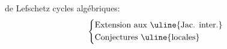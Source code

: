  de Lefschetz  cycles algébriques:
\[
\left\{\begin{aligned}
&\text{Extension aux \uline{Jac. inter.}}\\
&\text{Conjectures \uline{locales}}
\end{aligned}\right.
\]
